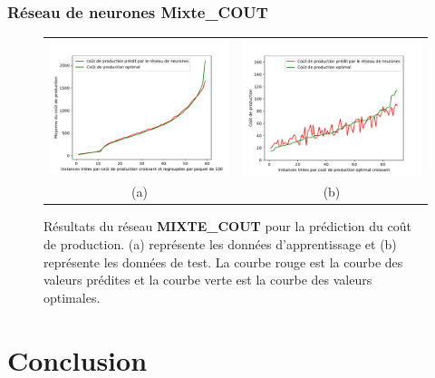 \documentclass[hyperref={bookmarks=false},aspectratio=169]{beamer}
\begin{document}
\begin{frame}
\frametitle{ Réseau de neurones Mixte\_COUT}

\begin{figure}[H]
	\centering
	\begin{tabular}{c c}
		\includegraphics[width=6cm]{figures/prediction_courbe_Al_He_complet_train.pdf}&
		\includegraphics[width=6cm]{figures/prediction_courbe_Al_He_complet_test.pdf} 
		\\
		(a) & (b)
	\end{tabular}
	\caption[Résultats du  réseau MIXTE\_COUT]{Résultats du  réseau \textbf{MIXTE\_COUT} pour la prédiction du coût de production. (a) représente les données d'apprentissage et (b) représente les données de test. La courbe rouge est la courbe des valeurs prédites et la courbe verte est la courbe des valeurs optimales.}\label{6000_prediction_courbe_Al_He_complet}
\end{figure}
\end{frame}

\section{Conclusion}
\end{document}
